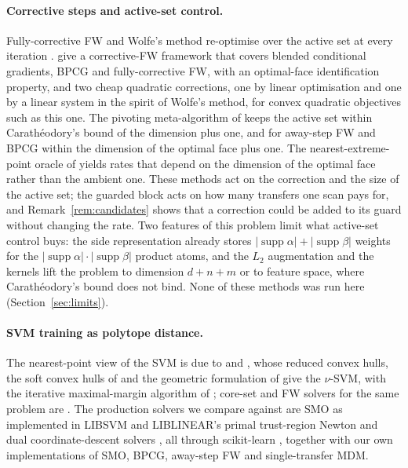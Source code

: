 \documentclass[pdflatex,sn-apa]{sn-jnl}%
\theoremstyle{thmstyleone}
\theoremstyle{thmstyletwo}
\begin{document}
\paragraph{Corrective steps and active-set control.} Fully-corrective
FW and Wolfe's method re-optimise over the active set at every
iteration \citep{lj2015}. \citet{halbey2025} give a corrective-FW
framework that covers blended conditional gradients, BPCG and
fully-corrective FW, with an optimal-face identification property, and
two cheap quadratic corrections, one by linear optimisation and one by a
linear system in the spirit of Wolfe's method, for convex quadratic
objectives such as this one. The pivoting meta-algorithm of
\citet{besancon2025} keeps the active set within Carath\'eodory's bound
of the dimension plus one, and for away-step FW and BPCG within the
dimension of the optimal face plus one. The nearest-extreme-point
oracle of \citet{garber2021} yields rates that depend on the dimension
of the optimal face rather than the ambient one. These methods act on
the correction and the size of the active set; the guarded block acts
on how many transfers one scan pays for, and Remark~\ref{rem:candidates}
shows that a correction could be added to its guard without changing
the rate. Two features of this problem limit what active-set control
buys: the side representation already stores $|\operatorname{supp}\alpha|+|\operatorname{supp}\beta|$
weights for the $|\operatorname{supp}\alpha|\cdot|\operatorname{supp}\beta|$ product atoms, and the
$L_2$ augmentation and the kernels lift the problem to dimension
$d+n+m$ or to feature space, where Carath\'eodory's bound does not
bind. None of these methods was run here
(Section~\ref{sec:limits}).

\paragraph{SVM training as polytope distance.} The nearest-point view
of the SVM is due to \citet{keerthi2000} and \citet{bennett2000duality},
whose reduced convex hulls, the soft convex hulls of \citet{crisp2000}
and the geometric formulation of \citet{mavroforakis2006} give the
$\nu$-SVM, with the iterative maximal-margin algorithm of
\citet{franc2003}; core-set and FW solvers for the same problem are
\citet{tsang2005,gartner2009,clarkson2010,nanculef2014}. The
production solvers we compare against are SMO \citep{platt1998} as
implemented in LIBSVM \citep{chang2011} and LIBLINEAR's primal
trust-region Newton and dual coordinate-descent solvers
\citep{fan2008,hsieh2008}, all through scikit-learn
\citep{pedregosa2011}, together with our own implementations of SMO,
BPCG, away-step FW and single-transfer MDM.
\end{document}
